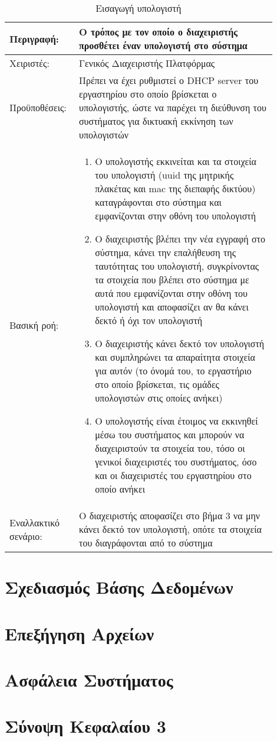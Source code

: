 \begin{table}[h]
	\caption{Εισαγωγή υπολογιστή}
	\label{tab:use-case-add-computer}
	\begin{tabular}{|p{0.2\linewidth}|p{0.7\linewidth}|}
		\hline
		Περιγραφή: & Ο τρόπος με τον οποίο ο διαχειριστής προσθέτει έναν υπολογιστή στο σύστημα \\ \hline
		Χειριστές: & Γενικός Διαχειριστής Πλατφόρμας \\ \hline
		Προϋποθέσεις: & Πρέπει να έχει ρυθμιστεί ο DHCP server του εργαστηρίου στο οποίο βρίσκεται ο υπολογιστής, ώστε να παρέχει τη διεύθυνση του συστήματος για δικτυακή εκκίνηση των υπολογιστών \\ \hline
		Βασική ροή: & 
		\vspace{-0.5cm}
		\begin{enumerate}
			\item Ο υπολογιστής εκκινείται και τα στοιχεία του υπολογιστή (uuid της μητρικής πλακέτας και mac της διεπαφής δικτύου) καταγράφονται στο σύστημα και εμφανίζονται στην οθόνη του υπολογιστή
			\item Ο διαχειριστής βλέπει την νέα εγγραφή στο σύστημα, κάνει την επαλήθευση της ταυτότητας του υπολογιστή, συγκρίνοντας τα στοιχεία που βλέπει στο σύστημα με αυτά που εμφανίζονται στην οθόνη του υπολογιστή και αποφασίζει αν θα κάνει δεκτό ή όχι τον υπολογιστή
			\item Ο διαχειριστής κάνει δεκτό τον υπολογιστή και συμπληρώνει τα απαραίτητα στοιχεία για αυτόν (το όνομά του, το εργαστήριο στο οποίο βρίσκεται, τις ομάδες υπολογιστών στις οποίες ανήκει)
			\item Ο υπολογιστής είναι έτοιμος να εκκινηθεί μέσω του συστήματος και μπορούν να διαχειριστούν τα στοιχεία του, τόσο οι γενικοί διαχειριστές του συστήματος, όσο και οι διαχειριστές του εργαστηρίου στο οποίο ανήκει
		\end{enumerate}\vspace{-0.7cm} \\ \hline
		Εναλλακτικό σενάριο: & Ο διαχειριστής αποφασίζει στο βήμα 3 να μην κάνει δεκτό τον υπολογιστή, οπότε τα στοιχεία του διαγράφονται από το σύστημα \\ \hline
	\end{tabular}
\end{table}

\section{Σχεδιασμός Βάσης Δεδομένων}



\section{Επεξήγηση Αρχείων}

\section{Ασφάλεια Συστήματος}

\section{Σύνοψη Κεφαλαίου 3}
